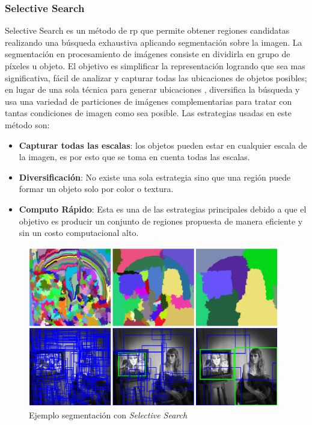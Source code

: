 \subsubsection*{Selective Search} \label{sub:selectivesearch}
Selective Search \citep{selectivesearch} es un método de \ac{rp} que  permite obtener regiones candidatas realizando una búsqueda exhaustiva aplicando segmentación sobre la imagen. La segmentación  en procesamiento de imágenes consiste en dividirla en grupo de píxeles u objeto. El objetivo es simplificar la representación logrando que sea mas significativa, fácil de analizar y capturar todas las ubicaciones de objetos posibles; en lugar de una sola técnica para generar ubicaciones , diversifica la  búsqueda y usa  una variedad de particiones de imágenes complementarias para tratar con tantas condiciones de imagen como sea posible.
Las estrategias usadas en este método son:
\begin{itemize}
\item \textbf{Capturar todas las escalas}: los objetos pueden estar en cualquier escala de la imagen, es por esto que se toma en cuenta todas las escalas.
\item \textbf{Diversificación}: No existe una sola estrategia sino que una región puede formar un objeto solo por color o textura.
\item \textbf{Computo Rápido}: Esta es una de las estrategias principales debido a que el objetivo es producir un conjunto de regiones propuesta de manera eficiente y sin un costo computacional alto.
\end{itemize}

\begin{figure}[H]
 \centering
  \includegraphics[height=7cm,keepaspectratio=true,clip=true]{imagenes/MarcoTeorico/selectivesearch.png}
  \caption{Ejemplo segmentación con \textit{Selective Search} } %
	\label{Fig: overlapping}
\end{figure}

